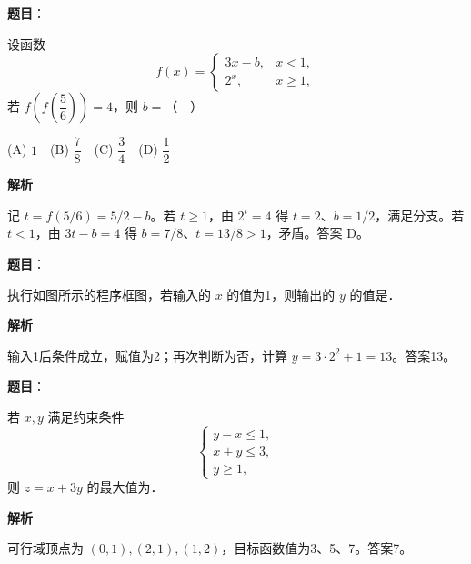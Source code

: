 \begin{answer}

\textbf{题目}：

设函数
\nopagebreak[4]
\[
f(x)=\begin{cases}3x-b,&x<1,\\2^x,&x\geqslant1,\end{cases}
\]
若 \(f\left(f\left(\dfrac56\right)\right)=4\)，则 \(b=\)（　）

(A) \(1\)　(B) \(\dfrac78\)　(C) \(\dfrac34\)　(D) \(\dfrac12\)

\textbf{解析}

记 \(t=f(5/6)=5/2-b\)。若 \(t\geqslant1\)，由 \(2^t=4\) 得 \(t=2\)、\(b=1/2\)，满足分支。若 \(t<1\)，由 \(3t-b=4\) 得 \(b=7/8\)、\(t=13/8>1\)，矛盾。答案 D。


\end{answer}
\begin{answer}

\textbf{题目}：

执行如图所示的程序框图，若输入的 \(x\) 的值为1，则输出的 \(y\) 的值是\gkblank{}．
\nopagebreak[4]
\begin{center}\end{center}
\nopagebreak[4]
\textbf{解析}

输入1后条件成立，赋值为2；再次判断为否，计算 \(y=3\cdot2^2+1=13\)。答案13。


\end{answer}
\begin{answer}

\textbf{题目}：

若 \(x,y\) 满足约束条件
\nopagebreak[4]
\[
\begin{cases}y-x\leqslant1,\\x+y\leqslant3,\\y\geqslant1,\end{cases}
\]
则 \(z=x+3y\) 的最大值为\gkblank{}．

\textbf{解析}

可行域顶点为 \((0,1),(2,1),(1,2)\)，目标函数值为3、5、7。答案7。


\end{answer}
